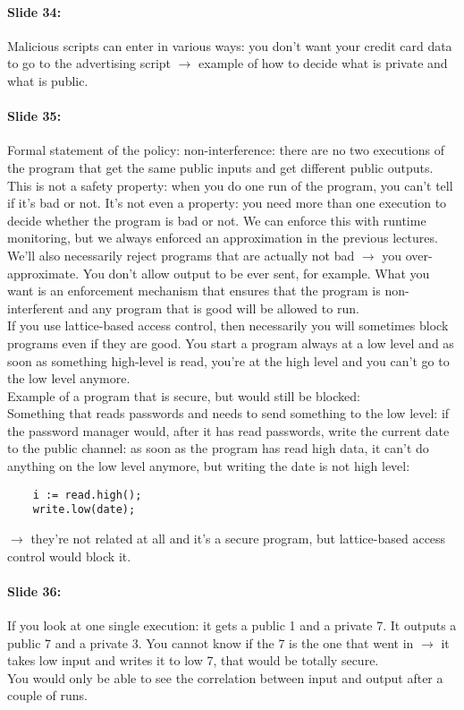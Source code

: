 \documentclass[10pt,a4paper]{report}
\begin{document}
\paragraph{Slide 34:} Malicious scripts can enter in various ways: you don't want your credit card data to go to the advertising script $\rightarrow$ example of how to decide what is private and what is public. 

\paragraph{Slide 35:} Formal statement of the policy: non-interference: there are no two executions of the program that get the same public inputs and get different public outputs. This is not a safety property: when you do one run of the program, you can't tell if it's bad or not. It's not even a property: you need more than one execution to decide whether the program is bad or not. We can enforce this with runtime monitoring, but we always enforced an approximation in the previous lectures. We'll also necessarily reject programs that are actually not bad $\rightarrow$ you over-approximate. You don't allow output to be ever sent, for example. What you want is an enforcement mechanism that ensures that the program is non-interferent and any program that is good will be allowed to run.\\
If you use lattice-based access control, then necessarily you will sometimes block programs even if they are good. You start a program always at a low level and as soon as something high-level is read, you're at the high level and you can't go to the low level anymore.\\
Example of a program that is secure, but would still be blocked: \\
Something that reads passwords and needs to send something to the low level: if the password manager would, after it has read passwords, write the current date to the public channel: as soon as the program has read high data, it can't do anything on the low level anymore, but writing the date is not high level:
\begin{verbatim}
	i := read.high();
	write.low(date);
\end{verbatim}
$\rightarrow$ they're not related at all and it's a secure program, but lattice-based access control would block it.

\paragraph{Slide 36:} If you look at one single execution: it gets a public 1 and a private 7. It outputs a public 7 and a private 3. You cannot know if the 7 is the one that went in $\rightarrow$ it takes low input and writes it to low 7, that would be totally secure.\\
You would only be able to see the correlation between input and output after a couple of runs.
\end{document}
